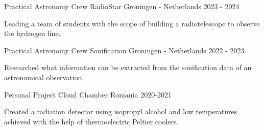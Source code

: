 

\begin{cventries}
\cventry
{Practical Astronomy Crew} %
{RadioStar} %
{Groningen - Netherlands} %
{2023 - 2024} %
{
\begin{cvitems} %
\item {Leading a team of students with the scope of building a radiotelescope to observe the hydrogen line.}
\end{cvitems}
}

\cventry
{Practical Astronomy Crew} %
{Sonification} %
{Groningen - Netherlands} %
{2022 - 2023} %
{
\begin{cvitems} %
\item {Researched what information can be extracted from the sonification data of an astronomical observation.}
\end{cvitems}
}


\cventry
{Personal Project} %
{Cloud Chamber} %
{Romania} %
{2020-2021} %
{
\begin{cvitems} %
\item {Created a radiation detector using isopropyl alcohol and low temperatures achieved with the help of thermoelectric Peltier coolers.}
\end{cvitems}
}


\end{cventries}
